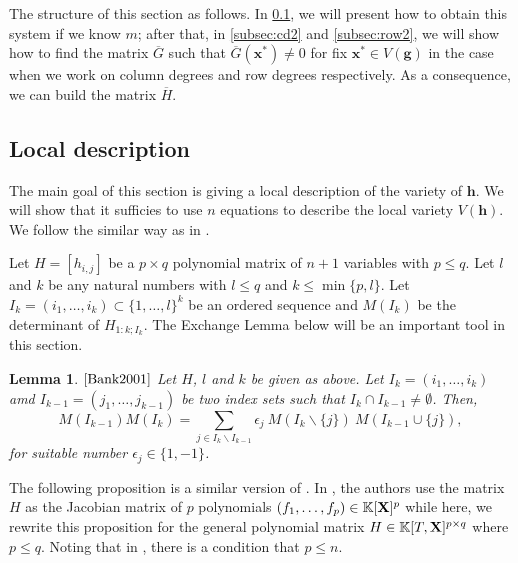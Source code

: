 \documentclass[11pt]{article}
\numberwithin{Property}{section}
\numberwithin{Theorem}{section}
\numberwithin{Proposition}{section}
\newtheorem{Lemma}{Lemma}%
\numberwithin{Lemma}{section}
\numberwithin{Corollary}{section}
\numberwithin{Definition}{section}
\numberwithin{Remark}{section}
\numberwithin{Conjecture}{section}
\numberwithin{Problem}{section}
\numberwithin{Claim}{section}
\theoremstyle{definition}
\numberwithin{Example}{section}
\def\h {\ensuremath{\mathbf{h}}}
\def\g {\ensuremath{\mathbf{g}}}
\renewcommand{\leq}{\leqslant}
\def\bar{\overline}
\newcommand{\field}{\mathbb{K}} %
\newcommand{\mat}[1]{\mathbf{\MakeUppercase{#1}}} %
\newcommand{\improve}[1]{\textcolor{blue}{#1}} %
\begin{document}
The structure of this section as follows. In \improve{\cref{subsec:local}}, we will present how to obtain this system if we know $m$; after that, in \improve{\cref{subsec:cd2}} and \improve{\cref{subsec:row2}}, we will show how to find the matrix $\bar{G}$ such that $\bar{G}(\mathbf{x}^*) \ne 0$ for fix $\mathbf{x}^* \in V(\g)$ in the case when we work on column degrees and row degrees respectively. As a consequence, we can build the matrix $\bar{H}$. 
\subsection{Local description}
\label{subsec:local}
The main goal of this section is giving a local description of the variety of $\h$. We will show that it sufficies to use $n$ equations to describe the local variety $V(\h)$. We follow the similar way as in \cite[Section ~ 2.2]{Bank2001}. 

Let $H = [h_{i,j}]$ be a $p \times q$ polynomial matrix of $n+1$ variables with $p \leq q$. Let $l$ and $k$ be any natural numbers with $l \leq q$ and $k \leq \min\{p,l\}$. Let $I_k = (i_1, \ldots, i_k) \subset \{1, \ldots, l\}^k$ be an ordered sequence and $M(I_k)$ be the determinant of $H_{1:k;I_k}$. The Exchange Lemma below will be an important tool in this section. 
\begin{Lemma}$\cite{Bank2001}$ Let $H$, $l$ and $k$ be given as above. Let $I_k = (i_1, \ldots, i_k)$ amd $I_{k-1} = (j_1, \ldots, j_{k-1})$ be two index sets such that $I_k \cap I_{k-1} \ne \emptyset$. Then, 
\[
M({I_{k-1}})M(I_k) = \sum_{j \in I_k \backslash I_{k-1}} \epsilon_j \ M(I_k \backslash \{j\}) \ M(I_{k-1} \cup \{j\}), 
\] for suitable number $\epsilon_j \in \{1, -1\}$. \label{exchange}
\end{Lemma}
The following proposition is a similar version of \cite[Proposition ~ 5]{Bank2001}. In \cite{Bank2001}, the authors use the matrix $H$ as the Jacobian matrix of $p$ polynomials $(f_1, \ldots, f_p) \in \field[\mat{X}]^p$ while here, we rewrite this proposition for the general polynomial matrix $H \in \field[T,\mat{X}]^{p \times q}$ where $p \leq q$. Noting that in \cite{Bank2001}, there is a condition that $p \leq n$. 
\end{document}
